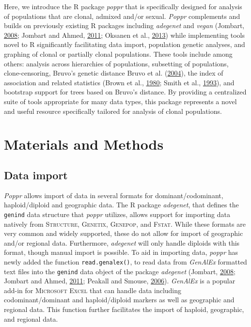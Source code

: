 \documentclass[double,12pt]{beavtex}
\begin{document}
  Here, we introduce the R package \emph{poppr} that is specifically
  designed for analysis of populations that are clonal, admixed and/or
  sexual. \emph{Poppr} complements and builds on previously existing R
  packages including \emph{adegenet} and \emph{vegan} (Jombart,
  \protect\hyperlink{ref-Jombart_2008}{2008}; Jombart and Ahmed,
  \protect\hyperlink{ref-jombart2011adegenet}{2011}; Oksanen et al.,
  \protect\hyperlink{ref-oksanen2013vegan}{2013}) while implementing tools
  novel to R significantly facilitating data import, population genetic
  analyses, and graphing of clonal or partially clonal populations. These
  tools include among others: analysis across hierarchies of populations,
  subsetting of populations, clone-censoring, Bruvo's genetic distance
  Bruvo et al. (\protect\hyperlink{ref-bruvo2004simple}{2004}), the index
  of association and related statistics (Brown et al.,
  \protect\hyperlink{ref-brown1980multilocus}{1980}; Smith et al.,
  \protect\hyperlink{ref-smith1993how}{1993}), and bootstrap support for
  trees based on Bruvo's distance. By providing a centralized suite of
  tools appropriate for many data types, this package represents a novel
  and useful resource specifically tailored for analysis of clonal
  populations.
  
  \section{Materials and Methods}\label{materials-and-methods}
  
  \subsection{Data import}\label{data-import}
  
  \emph{Poppr} allows import of data in several formats for
  dominant/codominant, haploid/diploid and geographic data. The R package
  \emph{adegenet}, that defines the \texttt{genind} data structure that
  \emph{poppr} utilizes, allows support for importing data natively from
  \textsc{Structure, Genetix, Genepop}, and \textsc{Fstat}. While these
  formats are very common and widely supported, these do not allow for
  import of geographic and/or regional data. Furthermore, \emph{adegenet}
  will only handle diploids with this format, though manual import is
  possible. To aid in importing data, \emph{poppr} has newly added the
  function \texttt{read.genalex()}, to read data from \emph{GenAlEx}
  formatted text files into the \texttt{genind} data object of the package
  \emph{adegenet} (Jombart, \protect\hyperlink{ref-Jombart_2008}{2008};
  Jombart and Ahmed, \protect\hyperlink{ref-jombart2011adegenet}{2011};
  Peakall and Smouse, \protect\hyperlink{ref-Peakall:2006}{2006}).
  \emph{GenAlEx} is a popular add-in for \textsc{Microsoft Excel} that can
  handle data including codominant/dominant and haploid/diploid markers as
  well as geographic and regional data. This function further facilitates
  the import of haploid, geographic, and regional data.
  
\end{document}
